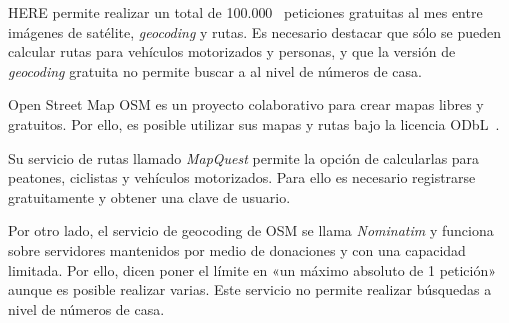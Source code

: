 \begin{definitionlist}
    HERE permite realizar un total de 100.000~\cite{LicenciaHERE} peticiones gratuitas al mes entre
    imágenes de satélite, \emph{geocoding} y rutas. Es necesario destacar que sólo se pueden
    calcular rutas para vehículos motorizados y personas, y que la versión de \emph{geocoding}
    gratuita no permite buscar a al nivel de números de casa.

  \item[Open Street Map] \acs{OSM} es un proyecto colaborativo para crear mapas libres y
    gratuitos. Por ello, es posible utilizar sus mapas y rutas bajo la licencia
    ODbL~\cite{LicenciaOSM}.

    Su servicio de rutas llamado \emph{MapQuest} permite la opción de calcularlas para peatones,
    ciclistas y vehículos motorizados. Para ello es necesario registrarse gratuitamente y obtener
    una clave de usuario.

    Por otro lado, el servicio de geocoding de \acs{OSM} se llama \emph{Nominatim} y funciona sobre
    servidores mantenidos por medio de donaciones y con una capacidad limitada. Por ello, dicen
    poner el límite en «un máximo absoluto de 1 petición»~\cite{Nominatim} aunque es posible
    realizar varias. Este servicio no permite realizar búsquedas a nivel de números de casa.
 
\end{definitionlist}


